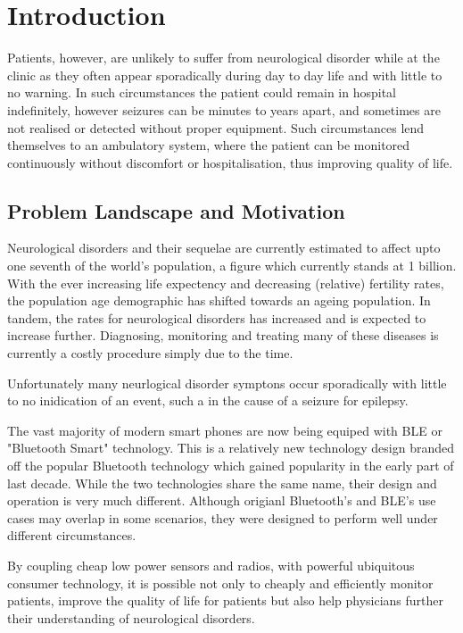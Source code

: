 \documentclass[]{article}
\begin{document}
\clearpage

\section{Introduction}
Patients, however, are unlikely to suffer from neurological disorder while at the clinic as they often appear sporadically during day to day life and with little to no warning. In such circumstances the patient could remain in hospital indefinitely, however seizures can be minutes to years apart, and sometimes are not realised or detected without proper equipment. Such circumstances lend themselves to an ambulatory system, where the patient can be monitored continuously without discomfort or hospitalisation, thus improving quality of life. 



\subsection{Problem Landscape and Motivation}
Neurological disorders and their sequelae are currently estimated to affect upto one seventh of the world's population, a figure which currently stands at 1 billion. With the ever increasing life expectency and decreasing (relative) fertility rates, the population age demographic has shifted towards an ageing population. In tandem, the rates for neurological disorders has increased and is expected to increase further. Diagnosing, monitoring and treating many of these diseases is currently a costly procedure simply due to the time. 

Unfortunately many neurlogical disorder symptons occur sporadically with little to no inidication of an event, such a  in the cause of a seizure for epilepsy.



The vast majority of modern smart phones are now being equiped with \ac{BLE} or "Bluetooth Smart" technology. This is a relatively new technology design branded off the popular Bluetooth technology which gained popularity in the early part of last decade. While the two technologies share the same name, their design and operation is very much different. Although origianl Bluetooth's and \ac{BLE}'s use cases may overlap in some scenarios, they were designed to perform well under different circumstances.  

By coupling cheap low power sensors and radios, with powerful ubiquitous consumer technology, it is possible not only to cheaply and efficiently monitor patients, improve the quality of life for patients but also help physicians further their understanding of neurological disorders.
\end{document}

